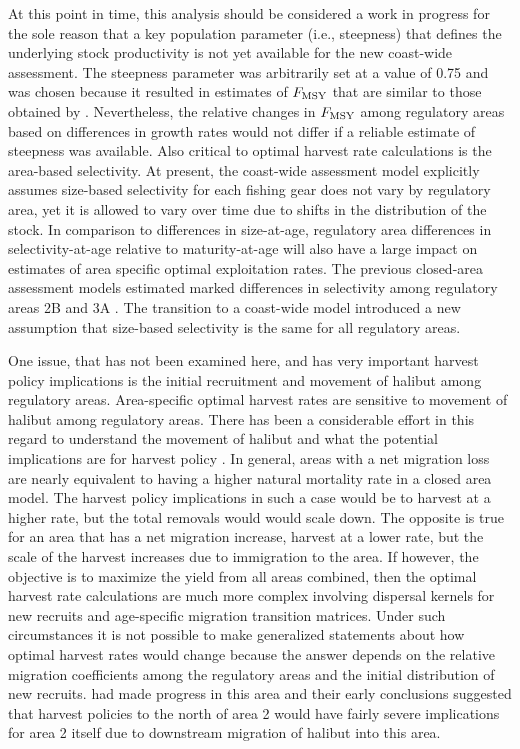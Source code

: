 At this point in time, this analysis should be considered a work in progress for the sole reason that a key population parameter (i.e., steepness) that defines the underlying stock productivity is not yet available for the new coast-wide assessment.  The steepness parameter was arbitrarily set at a value of 0.75 and was chosen because it resulted in estimates of $F_{\rm{MSY}}$ that are similar to those obtained by \cite{clark2006assessment}.  Nevertheless, the relative changes in $F_{\rm{MSY}}$ among regulatory areas based on differences in growth rates would not differ if a reliable estimate of steepness was available.  Also critical to optimal harvest rate calculations is the area-based selectivity.  At present, the coast-wide assessment model explicitly assumes size-based selectivity for each fishing gear does not vary by regulatory area, yet it is allowed to vary over time due to shifts in the distribution of the stock.  In comparison to differences in size-at-age, regulatory area differences in selectivity-at-age relative to maturity-at-age will also have a large impact on estimates of area specific optimal exploitation rates.  The previous closed-area assessment models estimated marked differences in selectivity among regulatory areas 2B and 3A \citep{clark2006assessment}. The transition to a coast-wide model introduced a new assumption that size-based selectivity is the same for all regulatory areas.

 One issue, that has not been examined here, and has very important harvest policy implications is the initial recruitment and movement of halibut among regulatory areas. Area-specific optimal harvest rates are sensitive to movement of halibut among regulatory areas.  There has been a considerable effort in this regard to understand the movement of halibut \citep[e.g.,][]{loher2006seasonal,webster2009analysis} and what the potential implications are for harvest policy \citep{valero2009exploring,valero2010effect}.  In general, areas with a net migration loss are nearly equivalent to having a higher natural mortality rate in a closed area model.  The harvest policy implications in such a case would be to harvest at a higher rate, but the total removals would would scale down.  The opposite is true for an area that has a net migration increase, harvest at a lower rate, but the scale of the harvest increases due to immigration to the area.  If however, the objective is to maximize the yield from all areas combined, then the optimal harvest rate calculations are much more complex involving dispersal kernels for new recruits and age-specific migration transition matrices.  Under such circumstances it is not possible to make generalized statements about how optimal harvest rates would change because the answer depends on the relative migration coefficients among the regulatory areas and the initial distribution of new recruits.  \cite{valero2010effect} had made progress in this area and their early conclusions suggested that harvest policies to the north of area 2 would have fairly severe implications for area 2 itself due to downstream migration of halibut into this area.


